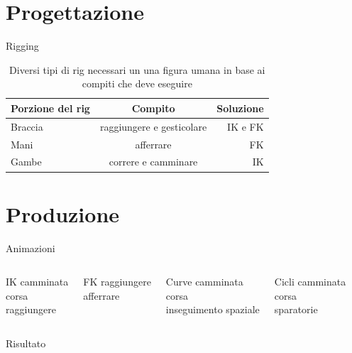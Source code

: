 \documentclass[10pt]{beamer}
\begin{document}
\section{Progettazione}
\begin{frame}{Rigging} %
  \begin{table}
					\caption{Diversi tipi di rig necessari un una figura umana in base ai compiti che deve eseguire}
		\begin{tabular}{lcr}
			\toprule
			Porzione del rig & Compito & Soluzione\\
			\midrule
			Braccia & raggiungere e gesticolare & IK e FK\\
			Mani & afferrare & FK\\
			Gambe & correre e camminare & IK\\
			\bottomrule
		\end{tabular}
	\end{table}	
\end{frame}

\section{Produzione}
\begin{frame}{Animazioni}
	\begin{columns}[T,onlytextwidth]

		\begin{exampleblock}{IK}
		camminata\\
		corsa\\
		raggiungere
		\end{exampleblock}
		\begin{exampleblock}{FK}
		raggiungere\\
		afferrare
		\end{exampleblock}

		\begin{exampleblock}{Curve}
		camminata\\
		corsa\\
		inseguimento spaziale
		\end{exampleblock}
		\begin{exampleblock}{Cicli}
		camminata\\
		corsa\\
		sparatorie
		\end{exampleblock}
	\end{columns}
\end{frame}

{
\begin{frame}[standout]

Risultato

\end{frame}
}
\end{document}
